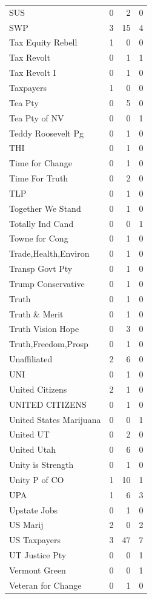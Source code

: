 \begin{supertabular}{lrrr}
SUS & 0 & 2 & 0\\
SWP & 3 & 15 & 4\\
Tax Equity Rebell & 1 & 0 & 0\\
Tax Revolt & 0 & 1 & 1\\
Tax Revolt I & 0 & 1 & 0\\
Taxpayers & 1 & 0 & 0\\
Tea Pty & 0 & 5 & 0\\
Tea Pty of NV & 0 & 0 & 1\\
Teddy Roosevelt Pg & 0 & 1 & 0\\
THI & 0 & 1 & 0\\
Time for Change & 0 & 1 & 0\\
Time For Truth & 0 & 2 & 0\\
TLP & 0 & 1 & 0\\
Together We Stand & 0 & 1 & 0\\
Totally Ind Cand & 0 & 0 & 1\\
Towne for Cong & 0 & 1 & 0\\
Trade,Health,Environ & 0 & 1 & 0\\
Transp Govt Pty & 0 & 1 & 0\\
Trump Conservative & 0 & 1 & 0\\
Truth & 0 & 1 & 0\\
Truth \& Merit & 0 & 1 & 0\\
Truth Vision Hope & 0 & 3 & 0\\
Truth,Freedom,Prosp & 0 & 1 & 0\\
Unaffiliated & 2 & 6 & 0\\
UNI & 0 & 1 & 0\\
United Citizens & 2 & 1 & 0\\
UNITED CITIZENS & 0 & 1 & 0\\
United States Marijuana & 0 & 0 & 1\\
United UT & 0 & 2 & 0\\
United Utah & 0 & 6 & 0\\
Unity is Strength & 0 & 1 & 0\\
Unity P of CO & 1 & 10 & 1\\
UPA & 1 & 6 & 3\\
Upstate Jobs & 0 & 1 & 0\\
US Marij & 2 & 0 & 2\\
US Taxpayers & 3 & 47 & 7\\
UT Justice Pty & 0 & 0 & 1\\
Vermont Green & 0 & 0 & 1\\
Veteran for Change & 0 & 1 & 0\\

\end{supertabular}
